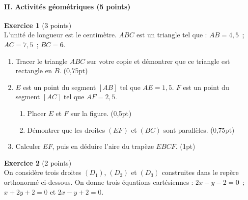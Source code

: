 \paragraph{II. Activités géométriques (5 points)}

\textbf{Exercice 1} (3 points) \\
L'unité de longueur est le centimètre. $ABC$ est un triangle tel que : $AB=4{,}5$~;
$AC=7{,}5$~; $BC=6$.
\begin{enumerate}[label=\arabic*)]
\item Tracer le triangle $ABC$ sur votre copie et démontrer que ce triangle est rectangle
en $B$. \hfill (0,75pt)
\item $E$ est un point du segment $[AB]$ tel que $AE=1{,}5$. $F$ est un point du segment
$[AC]$ tel que $AF=2{,}5$.
\begin{enumerate}[label=\alph*)]
\item Placer $E$ et $F$ sur la figure. \hfill (0,5pt)
\item Démontrer que les droites $(EF)$ et $(BC)$ sont parallèles. \hfill (0,75pt)
\end{enumerate}
\item Calculer $EF$, puis en déduire l'aire du trapèze $EBCF$. \hfill (1pt)
\end{enumerate}

\textbf{Exercice 2} (2 points) \\
On considère trois droites $(D_1)$, $(D_2)$ et $(D_3)$ construites dans le repère
orthonormé ci-dessous. On donne trois équations cartésiennes : $2x-y-2=0$~; $x+2y+2=0$ et
$2x-y+2=0$.

\begin{illus}
\end{illus}

